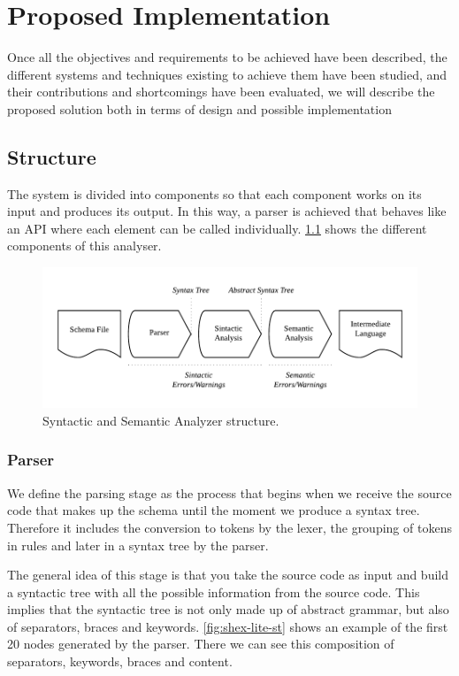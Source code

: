 \chapter{Proposed Implementation}
\label{ch:proposed-implementation}

Once all the objectives and requirements to be achieved have been described,
the different systems and techniques existing to achieve them have been studied,
and their contributions and shortcomings have been evaluated, we will describe
the proposed solution both in terms of design and possible implementation

\section{Structure}
The system is divided into components so that each component works on its input
and produces its output. In this way, a parser is achieved that behaves like
an API where each element can be called individually. \cref{fig:shex-lite-sema}
shows the different components of this analyser.

\begin{figure}
    \includegraphics[width=\textwidth]{images/sin-sem-structure.pdf}
    \centering
    \caption[Syntactic and Semantic Analyzer structure]{Syntactic and Semantic Analyzer structure.}
    \label{fig:shex-lite-sema}
\end{figure}

\subsection{Parser}
We define the parsing stage as the process that begins when we receive the source code that makes up
the schema until the moment we produce a syntax tree. Therefore it includes the conversion to tokens
by the lexer, the grouping of tokens in rules and later in a syntax tree by the parser.

The general idea of this stage is that you take the source code as input and build a syntactic tree with all
the possible information from the source code. This implies that the syntactic tree is not only made up of
abstract grammar, but also of separators, braces and keywords. \cref{fig:shex-lite-st} shows an example
of the first 20 nodes generated by the parser. There we can see this composition of separators, keywords, braces
and content.

